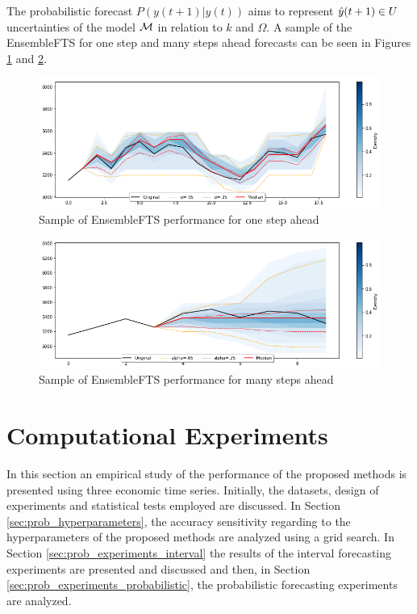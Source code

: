 The probabilistic forecast $P(y(t+1)|y(t))$ aims to represent $\hat{y}(t+1) \in U$ uncertainties of the model $\mathcal{M}$ in relation to $k$ and $\Omega$. A sample of the EnsembleFTS for one step and many steps ahead forecasts can be seen in Figures \ref{fig:ensemblefts_sample_onestep} and \ref{fig:ensemblefts_sample_manystep}. 

\begin{figure}[htb]
    \centering
    \includegraphics[width=\textwidth]{figures/ensemblefts_sample_onestep.png}
    \caption{Sample of EnsembleFTS performance for one step ahead}
    \label{fig:ensemblefts_sample_onestep}
\end{figure}

\begin{figure}[htb]
    \centering
    \includegraphics[width=\textwidth]{figures/ensemblefts_sample_manystep.png}
    \caption{Sample of EnsembleFTS performance for many steps ahead}
    \label{fig:ensemblefts_sample_manystep}
\end{figure}

%
\section{Computational Experiments}
\label{sec:prob_experiments}

In this section an empirical study of the performance of the proposed methods is presented using three economic time series. Initially, the datasets, design of experiments and statistical tests employed are discussed. In Section \ref{sec:prob_hyperparameters}, the accuracy sensitivity regarding to the hyperparameters of the proposed methods are analyzed using a grid search. In Section \ref{sec:prob_experiments_interval} the results of the interval forecasting  experiments are presented and discussed and then, in Section \ref{sec:prob_experiments_probabilistic}, the probabilistic forecasting experiments are analyzed.

